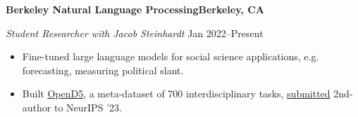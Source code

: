 \textbf{Berkeley Natural Language Processing\hfill Berkeley, CA}\par
\textit{Student Researcher with Jacob Steinhardt} \hfill Jan 2022--Present\par
\begin{itemize}
	\item Fine-tuned large language models for social science applications, e.g. forecasting, measuring political slant.
	\item Built \href{https://github.com/petezh/OpenD5}{OpenD5}, a meta-dataset of 700 interdisciplinary tasks, \href{https://arxiv.org/abs/2302.14233}{submitted} 2nd-author to NeurIPS '23.
\end{itemize} \par